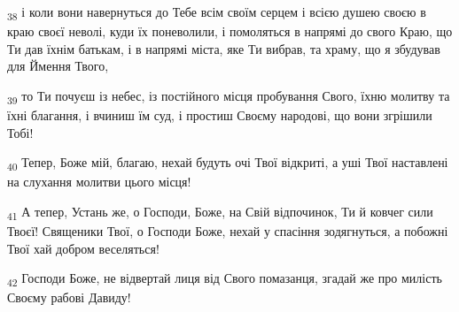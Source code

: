 \begin{tcolorbox}
\textsubscript{38} і коли вони навернуться до Тебе всім своїм серцем і всією душею своєю в краю своєї неволі, куди їх поневолили, і помоляться в напрямі до свого Краю, що Ти дав їхнім батькам, і в напрямі міста, яке Ти вибрав, та храму, що я збудував для Ймення Твого,
\end{tcolorbox}
\begin{tcolorbox}
\textsubscript{39} то Ти почуєш із небес, із постійного місця пробування Свого, їхню молитву та їхні благання, і вчиниш їм суд, і простиш Своєму народові, що вони згрішили Тобі!
\end{tcolorbox}
\begin{tcolorbox}
\textsubscript{40} Тепер, Боже мій, благаю, нехай будуть очі Твої відкриті, а уші Твої наставлені на слухання молитви цього місця!
\end{tcolorbox}
\begin{tcolorbox}
\textsubscript{41} А тепер, Устань же, о Господи, Боже, на Свій відпочинок, Ти й ковчег сили Твоєї! Священики Твої, о Господи Боже, нехай у спасіння зодягнуться, а побожні Твої хай добром веселяться!
\end{tcolorbox}
\begin{tcolorbox}
\textsubscript{42} Господи Боже, не відвертай лиця від Свого помазанця, згадай же про милість Своєму рабові Давиду!
\end{tcolorbox}
